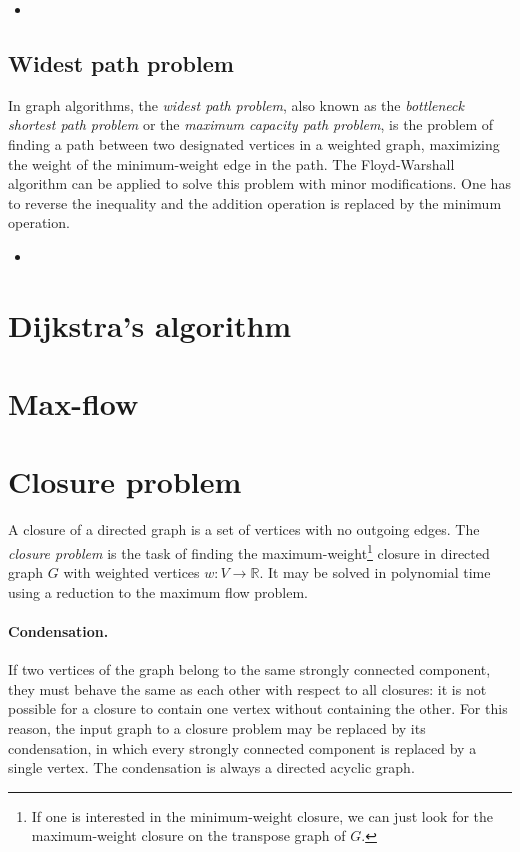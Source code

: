 \documentclass[a4paper, twoside,openany]{book}
\newcounter{problem}\setcounter{problem}{0}
\newcommand{\insertcode}[2]{\begin{itemize}\item[]\end{itemize}} %
\begin{document}
\insertcode{"codes/floyd_warshall_reconstruct.cpp"}{A C++ code for the Floyd-Warshall algorithm with information about the minimal path.} 

\subsection{Widest path problem}
In graph algorithms, the \emph{widest path problem}, also known as the \emph{bottleneck shortest path problem} or the \emph{maximum capacity path problem}, is the problem of finding a path between two designated vertices in a weighted graph, maximizing the weight of the minimum-weight edge in the path.
The Floyd-Warshall algorithm can be applied to solve this problem with minor modifications.
One has to reverse the inequality and the addition operation is replaced by the minimum operation.

\insertcode{"codes/floyd_warshall_routing.cpp"}{A C++ code for the Floyd-Warshall algorithm used for optimal routing in a constrained network.} 


\section{Dijkstra's algorithm}
\label{Dijkstra}


\section{Max-flow}
\label{max-flow}

\section{Closure problem}
A closure of a directed graph is a set of vertices with no outgoing edges. 
The \emph{closure problem} is the task of finding the maximum-weight\footnote{If one is interested in the minimum-weight closure, we can just look for the maximum-weight closure on the transpose graph of $G$.} closure in directed graph $G$ with weighted vertices $w : V \rightarrow \mathbb R$. 
It may be solved in polynomial time using a reduction to the maximum flow problem. 

\paragraph{Condensation.} 
If two vertices of the graph belong to the same strongly connected component, they must behave the same as each other with respect to all closures: it is not possible for a closure to contain one vertex without containing the other. 
For this reason, the input graph to a closure problem may be replaced by its condensation, in which every strongly connected component is replaced by a single vertex. 
The condensation is always a directed acyclic graph.
\end{document}
